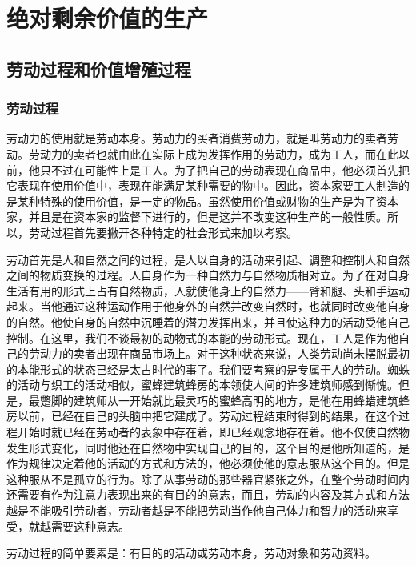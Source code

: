 \documentclass{ctexbook}
\begin{document}
\part{绝对剩余价值的生产}

\chapter{劳动过程和价值增殖过程}

    \section{劳动过程}
    
    劳动力的使用就是劳动本身。劳动力的买者消费劳动力，就是叫劳动力的卖者劳动。劳动力的卖者也就由此在实际上成为发挥作用的劳动力，成为工人，而在此以前，他只不过在可能性上是工人。为了把自己的劳动表现在商品中，他必须首先把它表现在使用价值中，表现在能满足某种需要的物中。因此，资本家要工人制造的是某种特殊的使用价值，是一定的物品。虽然使用价值或财物的生产是为了资本家，并且是在资本家的监督下进行的，但是这并不改变这种生产的一般性质。所以，劳动过程首先要撇开各种特定的社会形式来加以考察。

    劳动首先是人和自然之间的过程，是人以自身的活动来引起、调整和控制人和自然之间的物质变换的过程。人自身作为一种自然力与自然物质相对立。为了在对自身生活有用的形式上占有自然物质，人就使他身上的自然力——臂和腿、头和手运动起来。当他通过这种运动作用于他身外的自然并改变自然时，也就同时改变他自身的自然。他使自身的自然中沉睡着的潜力发挥出来，并且使这种力的活动受他自己控制。在这里，我们不谈最初的动物式的本能的劳动形式。现在，工人是作为他自己的劳动力的卖者出现在商品市场上。对于这种状态来说，人类劳动尚未摆脱最初的本能形式的状态已经是太古时代的事了。我们要考察的是专属于人的劳动。蜘蛛的活动与织工的活动相似，蜜蜂建筑蜂房的本领使人间的许多建筑师感到惭愧。但是，最蹩脚的建筑师从一开始就比最灵巧的蜜蜂高明的地方，是他在用蜂蜡建筑蜂房以前，已经在自己的头脑中把它建成了。劳动过程结束时得到的结果，在这个过程开始时就已经在劳动者的表象中存在着，即已经观念地存在着。他不仅使自然物发生形式变化，同时他还在自然物中实现自己的目的，这个目的是他所知道的，是作为规律决定着他的活动的方式和方法的，他必须使他的意志服从这个目的。但是这种服从不是孤立的行为。除了从事劳动的那些器官紧张之外，在整个劳动时间内还需要有作为注意力表现出来的有目的的意志，而且，劳动的内容及其方式和方法越是不能吸引劳动者，劳动者越是不能把劳动当作他自己体力和智力的活动来享受，就越需要这种意志。

    劳动过程的简单要素是：有目的的活动或劳动本身，劳动对象和劳动资料。
\end{document}

